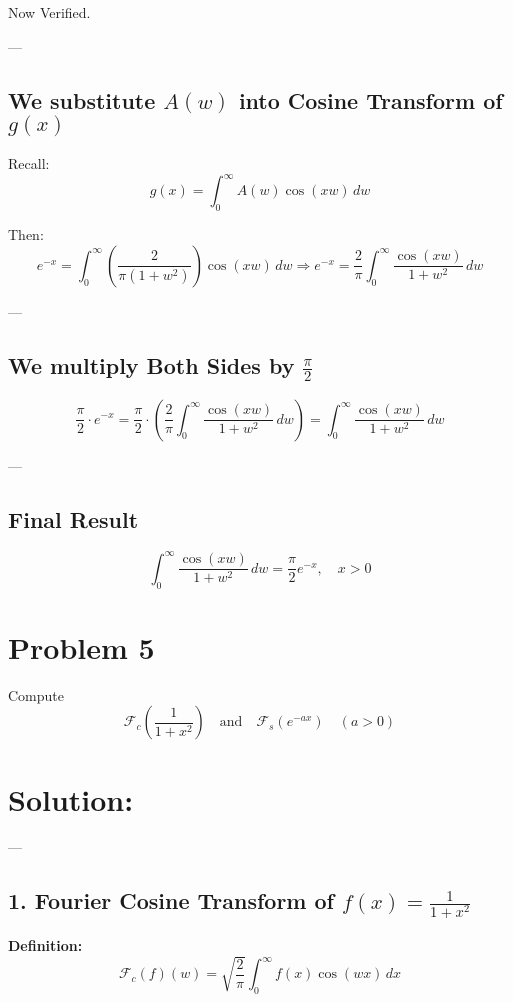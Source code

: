 \documentclass{article}
\begin{document}
Now Verified.

---

\subsection*{We substitute \( A(w) \) into Cosine Transform of \( g(x) \)}

Recall:
\[
g(x) = \int_0^\infty A(w) \cos(xw) \, dw
\]

Then:
\[
e^{-x} = \int_0^\infty \left( \frac{2}{\pi(1 + w^2)} \right) \cos(xw) \, dw
\Rightarrow
e^{-x} = \frac{2}{\pi} \int_0^\infty \frac{\cos(xw)}{1 + w^2} \, dw
\]

---

\subsection*{We multiply Both Sides by \( \frac{\pi}{2} \)}

\[
\frac{\pi}{2} \cdot e^{-x}
= \frac{\pi}{2} \cdot \left( \frac{2}{\pi} \int_0^\infty \frac{\cos(xw)}{1 + w^2} \, dw \right)
= \int_0^\infty \frac{\cos(xw)}{1 + w^2} \, dw
\]

---

\subsection*{Final Result}

\[
\boxed{
\int_0^\infty \frac{\cos(xw)}{1 + w^2} \, dw = \frac{\pi}{2} e^{-x}, \quad x > 0
}
\]


\newpage
\section*{Problem 5}

\noindent
Compute
\[
\mathcal{F}_c\left( \frac{1}{1 + x^2} \right)
\quad \text{and} \quad
\mathcal{F}_s\left( e^{-ax} \right) \quad (a > 0)
\]

\section*{Solution:}
---

\subsection*{1. Fourier Cosine Transform of \( f(x) = \frac{1}{1 + x^2} \)}

\textbf{Definition:}
\[
\mathcal{F}_c(f)(w) = \sqrt{\frac{2}{\pi}} \int_0^\infty f(x) \cos(wx) \, dx
\]
\end{document}
